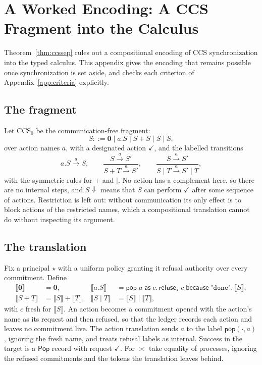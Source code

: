 \documentclass[11pt,openany]{book}
\theoremstyle{remark}
\newcommand{\Pop}{\mathsf{Pop}}
\begin{document}
\chapter{A Worked Encoding: A CCS Fragment into the Calculus}
\label{app:worked}

Theorem~\ref{thm:ccssep} rules out a compositional encoding of CCS
synchronization into the typed calculus. This appendix gives the encoding
that remains possible once synchronization is set aside, and checks each
criterion of Appendix~\ref{app:criteria} explicitly.

\section{The fragment}

Let $\mathrm{CCS}_0$ be the communication-free fragment:
\[
S ::= \mathbf 0 \mid a.S \mid S+S \mid S\mid S,
\]
over action names $a$, with a designated action $\checkmark$, and the
labelled transitions
\[
a.S\xrightarrow{a}S,\qquad
\frac{S\xrightarrow{a}S'}{S+T\xrightarrow{a}S'},\qquad
\frac{S\xrightarrow{a}S'}{S\mid T\xrightarrow{a}S'\mid T},
\]
with the symmetric rules for $+$ and $\mid$. No action has a complement
here, so there are no internal steps, and $S\Downarrow$ means that $S$ can
perform $\checkmark$ after some sequence of actions. Restriction is left
out: without communication its only effect is to block actions of the
restricted names, which a compositional translation cannot do without
inspecting its argument.

\section{The translation}

Fix a principal $\star$ with a uniform policy granting it refusal
authority over every commitment. Define
\[
\begin{aligned}
\llbracket\mathbf 0\rrbracket&=\mathbf 0, &
\llbracket a.S\rrbracket&=\mathsf{pop}\;a\;\mathsf{as}\;c.\,
\mathsf{refuse}_\star\;c\;\mathsf{because}\;\texttt{"done"}.\,\llbracket S\rrbracket,\\
\llbracket S+T\rrbracket&=\llbracket S\rrbracket+\llbracket T\rrbracket, &
\llbracket S\mid T\rrbracket&=\llbracket S\rrbracket\mid\llbracket T\rrbracket,
\end{aligned}
\]
with $c$ fresh for $\llbracket S\rrbracket$. An action becomes a
commitment opened with the action's name as its request and then refused,
so that the ledger records each action and leaves no commitment live. The
action translation sends $a$ to the label $\mathsf{pop}(\cdot,a)$,
ignoring the fresh name, and treats refusal labels as internal. Success in
the target is a $\Pop$ record with request $\checkmark$. For $\asymp$ take
equality of processes, ignoring the refused commitments and the tokens the
translation leaves behind.
\end{document}
